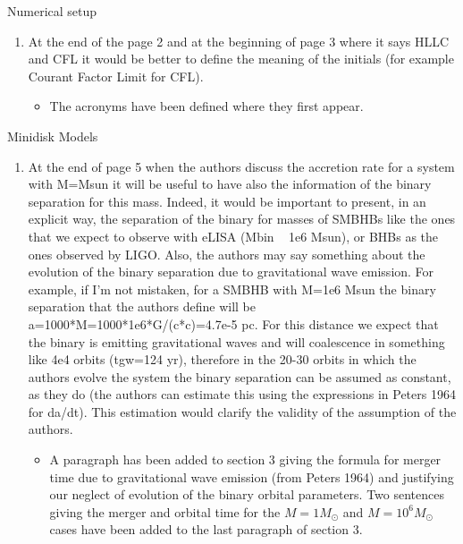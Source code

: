 \documentclass{letter}
\begin{document}
\begin{flushleft}
Numerical setup
\begin{enumerate}
\item At the end of the page 2 and at the beginning of page 3 where it says HLLC and CFL it would be better to define the meaning of the initials (for example Courant Factor Limit for CFL).
	\begin{itemize}
		\item The acronyms have been defined where they first appear.
	\end{itemize}
\end{enumerate}

Minidisk Models
\begin{enumerate}
\item At the end of page 5 when the authors discuss the accretion rate for a system with M=Msun it will be useful to have also the information of the binary separation for this mass. Indeed, it would be important to present, in an explicit way, the separation of the binary for masses of SMBHBs like the ones that we expect to observe with eLISA (Mbin ~ 1e6 Msun), or BHBs as the ones observed by LIGO. Also, the authors may say something about the evolution of the binary separation due to gravitational wave emission. For example, if I'm not mistaken, for a SMBHB with M=1e6 Msun the binary separation that the authors define will be a=1000*M=1000*1e6*G/(c*c)=4.7e-5 pc. For this distance we expect that the binary is emitting gravitational waves and will coalescence in something like 4e4 orbits (tgw=124 yr), therefore in the 20-30 orbits in which the authors evolve the system the binary separation can be assumed as constant, as they do (the authors can estimate this using the expressions in Peters 1964 for da/dt). This estimation would clarify the validity of the assumption of the authors.
	\begin{itemize}
		\item A paragraph has been added to section 3 giving the formula for merger time due to gravitational wave emission (from Peters 1964) and justifying our neglect of evolution of the binary orbital parameters. Two sentences giving the merger and orbital time for the $M=1 M_{\odot}$  and $M=10^6 M_{\odot}$ cases have been added to the last paragraph of section 3.
	\end{itemize}
\end{enumerate}


\end{flushleft}
\end{document}
